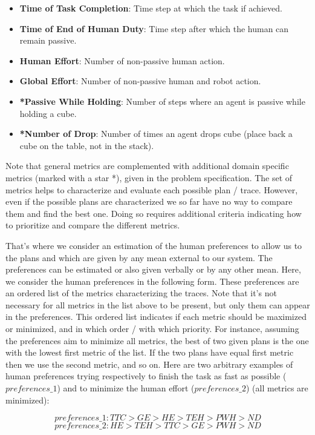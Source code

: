 \begin{itemize}
    \item \textbf{Time of Task Completion}: Time step at which the task if achieved.
    \item \textbf{Time of End of Human Duty}: Time step after which the human can remain passive.
    \item \textbf{Human Effort}: Number of non-passive human action.
    \item \textbf{Global Effort}: Number of non-passive human and robot action.
    \item \textbf{*Passive While Holding}: Number of steps where an agent is passive while holding a cube.
    \item \textbf{*Number of Drop}: Number of times an agent drops cube (place back a cube on the table, not in the stack).
\end{itemize}

Note that general metrics are complemented with additional domain specific metrics (marked with a star *), given in the problem specification. The set of metrics helps to characterize and evaluate each possible plan / trace. However, even if the possible plans are characterized we so far have no way to compare them and find the best one. Doing so requires additional criteria indicating how to prioritize and compare the different metrics.

That's where we consider an estimation of the human preferences to allow us to the plans and which are given by any mean external to our system. The preferences can be estimated or also given verbally or by any other mean. Here, we consider the human preferences in the following form. These preferences are an ordered list of the metrics characterizing the traces. Note that it's not necessary for all metrics in the list above to be present, but only them can appear in the preferences. This ordered list indicates if each metric should be maximized or minimized, and in which order / with which priority. For instance, assuming the preferences aim to minimize all metrics, the best of two given plans is the one with the lowest first metric of the list. If the two plans have equal first metric then we use the second metric, and so on. Here are two arbitrary examples of human preferences trying respectively to finish the task as fast as possible ($preferences\_1$) and to minimize the human effort ($preferences\_2$) (all metrics are minimized):

\begin{equation*}
    preferences\_1: TTC > GE > HE > TEH > PWH > ND 
\end{equation*}
\begin{equation*}
    preferences\_2: HE > TEH > TTC > GE > PWH > ND 
\end{equation*}


